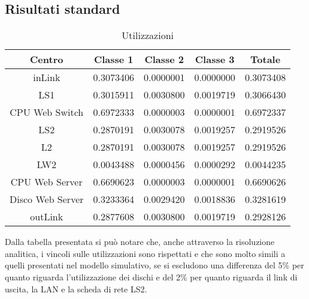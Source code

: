 \subsection{Risultati standard}
\begin{table}[htbp]
\begin{center}
\begin{tabular}{|c|c|c|c|c|}
\hline
Centro	&Classe 1	&Classe 2	&Classe 3	&Totale\\
\hline
\hline
inLink & 0.3073406 & 0.0000001 & 0.0000000 & 0.3073408 \\ \hline
LS1 & 0.3015911 & 0.0030800 & 0.0019719 & 0.3066430 \\ \hline
CPU Web Switch & 0.6972333 & 0.0000003 & 0.0000001 & 0.6972337 \\ \hline
LS2 & 0.2870191 & 0.0030078 & 0.0019257 & 0.2919526 \\ \hline
L2 & 0.2870191 & 0.0030078 & 0.0019257 & 0.2919526 \\ \hline
LW2 & 0.0043488 & 0.0000456 & 0.0000292 & 0.0044235 \\ \hline
CPU Web Server & 0.6690623 & 0.0000003 & 0.0000001 & 0.6690626 \\ \hline
Disco Web Server & 0.3233364 & 0.0029420 & 0.0018836 & 0.3281619 \\ \hline
outLink & 0.2877608 & 0.0030800 & 0.0019719 & 0.2928126 \\ \hline
\end{tabular}
\end{center}
\caption{Utilizzazioni}
\label{utilizzazioni}
\end{table}
Dalla tabella presentata si può notare che, anche attraverso la risoluzione analitica, i vincoli sulle utilizzazioni sono rispettati e che sono molto simili a quelli presentati nel modello simulativo, se si escludono una differenza del 5\% per quanto riguarda l'utilizzazione dei dischi e del 2\% per quanto riguarda il link di uscita, la LAN e la scheda di rete LS2.
